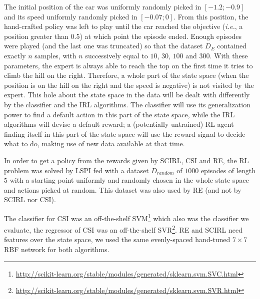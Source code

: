 \documentclass{llncs}
\begin{document}
The initial position of the car was uniformly randomly picked in $[-1.2;-0.9]$ and its speed uniformly randomly picked in $[-0.07;0]$. From this position, the hand-crafted policy was left to play until the car reached the objective ({\it i.e.}, a position greater than $0.5$) at which point the episode ended. Enough episodes were played (and the last one was truncated) so that the dataset $D_E$ contained exactly $n$ samples, with $n$ successively equal to $10$, $30$, $100$ and $300$. With these parameters, the expert is always able to reach the top on the first time it tries to climb the hill on the right. Therefore, a whole part of the state space (when the position is on the hill on the right and the speed is negative) is not visited by the expert. This hole about the state space in the data will be dealt with differently by the classifier and the IRL algorithms. The classifier will use its generalization power to find a default action in this part of the state space, while the IRL algorithms will devise a default reward; a (potentially untrained) RL agent finding itself in this part of the state space will use the reward signal to decide what to do, making use of new data available at that time.

In order to get a policy from the rewards given by SCIRL, CSI and RE, the RL problem was solved by LSPI fed with a dataset $D_{random}$ of $1000$ episodes of length $5$ with a starting point uniformly and randomly chosen in the whole state space and actions picked at random. This dataset was also used by RE (and not by SCIRL nor CSI).

The classifier for CSI was an off-the-shelf SVM\footnote{\url{http://scikit-learn.org/stable/modules/generated/sklearn.svm.SVC.html}} which also was the classifier we evaluate, the regressor of CSI was an off-the-shelf SVR\footnote{\url{http://scikit-learn.org/stable/modules/generated/sklearn.svm.SVR.html}}. RE and SCIRL need features over the state space, we used the same evenly-spaced hand-tuned $7\times 7$ RBF network for both algorithms.
\end{document}
